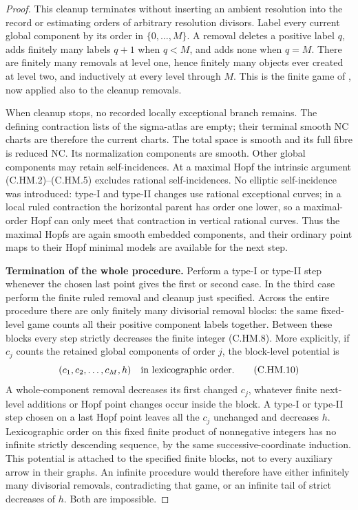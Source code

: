 \begin{proof}
This cleanup terminates without inserting an
ambient resolution into the record or estimating
orders of
arbitrary resolution divisors.  Label every
current global component by its order in
\(\{0,\ldots,M\}\).  A removal deletes a
positive label \(q\), adds finitely many
labels \(q+1\) when \(q<M\), and adds none
when \(q=M\).  There are finitely many
removals at level one, hence finitely many
objects ever created at level two, and
inductively at every level through \(M\).
This is the finite game of
\cite[\S9]{Kulikov1981}, now applied also
to the cleanup removals.

When cleanup stops, no recorded locally
exceptional branch remains.  The defining
contraction lists of the sigma-atlas are
empty; their terminal smooth NC charts
are therefore the current charts.
The total space is smooth and its full
fibre is reduced NC.  Its normalization
components are smooth.  Other global
components may retain self-incidences.
At a maximal Hopf the intrinsic argument
(C.HM.2)--(C.HM.5) excludes rational
self-incidences.  No elliptic self-incidence
was introduced: type-I and type-II changes
use rational exceptional curves; in a
local ruled contraction the horizontal
parent has order one lower, so a
maximal-order Hopf can only meet that
contraction in vertical rational curves.
Thus the maximal Hopfs are again smooth
embedded components, and their ordinary
point maps to their Hopf minimal models
are available for the next step.

\par\medskip\noindent\textbf{Termination of the whole procedure.}
Perform a type-I or type-II step whenever
the chosen last point gives the first or
second case.  In the third case perform
the finite ruled removal and cleanup
just specified.  Across the entire
procedure there are only finitely many
divisorial removal blocks: the same
fixed-level game counts all their
positive component labels together.
Between these blocks every step strictly
decreases the finite integer (C.HM.8).
More explicitly, if \(c_j\) counts the
retained global components of order \(j\),
the block-level potential is
\[
                 (c_1,c_2,\ldots,c_M,h)
                 \quad\hbox{in lexicographic order.}
\tag{C.HM.10}
\]
A whole-component removal decreases its
first changed \(c_j\), whatever finite
next-level additions or Hopf point
changes occur inside the block.
A type-I or type-II step chosen on a
last Hopf point leaves all the \(c_j\)
unchanged and decreases \(h\).
Lexicographic order on this fixed
finite product of nonnegative integers
has no infinite strictly descending
sequence, by the same successive-coordinate
induction.  This potential is attached
to the specified finite blocks, not to
every auxiliary arrow in their graphs.
An infinite procedure would therefore
have either infinitely many divisorial
removals, contradicting that game, or
an infinite tail of strict decreases of
\(h\).  Both are impossible.


\end{proof}
